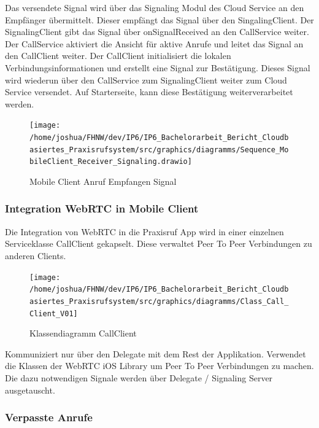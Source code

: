 Das versendete Signal wird über das Signaling Modul des Cloud Service an den Empfänger übermittelt.
Dieser empfängt das Signal über den SingalingClient.
Der SignalingClient gibt das Signal über onSignalReceived an den CallService weiter.
Der CallService aktiviert die Ansicht für aktive Anrufe und leitet das Signal an den CallClient weiter.
Der CallClient initialisiert die lokalen Verbindungsinformationen und erstellt eine Signal zur Bestätigung.
Dieses Signal wird wiederun über den CallService zum SignalingClient weiter zum Cloud Service versendet.
Auf Starterseite, kann diese Bestätigung weiterverarbeitet werden.

\begin{figure}[h]
    \centering
    \begin{minipage}[b]{0.8\textwidth}
        \texttt{[image: /home/joshua/FHNW/dev/IP6/IP6\_Bachelorarbeit\_Bericht\_Cloudbasiertes\_Praxisrufsystem/src/graphics/diagramms/Sequence\_MobileClient\_Receiver\_Signaling.drawio]}
        \caption{Mobile Client Anruf Empfangen Signal}
    \end{minipage}
\end{figure}

\clearpage

\subsubsection{Integration WebRTC in Mobile Client}

Die Integration von WebRTC in die Praxisruf App wird in einer einzelnen Serviceklasse CallClient gekapselt.
Diese verwaltet Peer To Peer Verbindungen zu anderen Clients.

\begin{figure}[h]
    \centering
    \begin{minipage}[b]{0.5\textwidth}
        \texttt{[image: /home/joshua/FHNW/dev/IP6/IP6\_Bachelorarbeit\_Bericht\_Cloudbasiertes\_Praxisrufsystem/src/graphics/diagramms/Class\_Call\_Client\_V01]}
        \caption{Klassendiagramm CallClient}
    \end{minipage}
\end{figure}

Kommuniziert nur über den Delegate mit dem Rest der Applikation.
Verwendet die Klassen der WebRTC iOS Library um Peer To Peer Verbindungen zu machen.
Die dazu notwendigen Signale werden über Delegate / Signaling Server ausgetauscht.

\subsubsection{Verpasste Anrufe}

